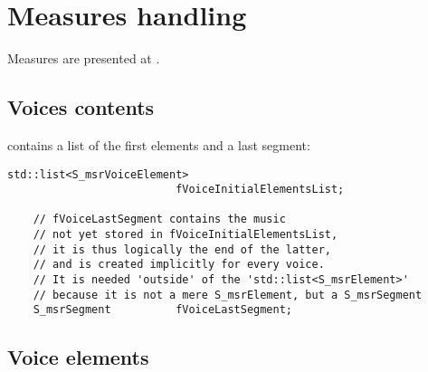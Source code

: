 



\chapter{Measures handling}\label{Measures handling}

Measures are presented at .


\section{Voices contents}

 contains a list of the first elements and a last segment:
\begin{lstlisting}[language=CPlusPlus]
    std::list<S_msrVoiceElement>
                          fVoiceInitialElementsList;

    // fVoiceLastSegment contains the music
    // not yet stored in fVoiceInitialElementsList,
    // it is thus logically the end of the latter,
    // and is created implicitly for every voice.
    // It is needed 'outside' of the 'std::list<S_msrElement>'
    // because it is not a mere S_msrElement, but a S_msrSegment
    S_msrSegment          fVoiceLastSegment;
\end{lstlisting}


\section{Voice elements}

